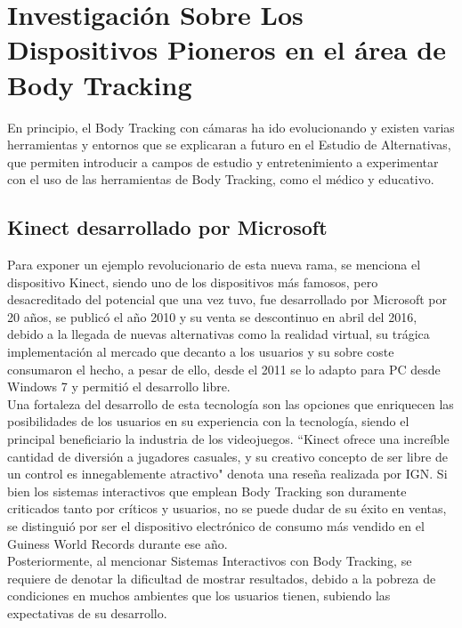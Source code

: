 \section{Investigación Sobre Los Dispositivos Pioneros en el área de Body Tracking}

En principio, el Body Tracking con cámaras ha ido evolucionando y existen varias herramientas y entornos que se explicaran a futuro en el Estudio de Alternativas, que permiten introducir a campos de estudio y entretenimiento a experimentar con el uso de las herramientas de Body Tracking, como el médico y educativo.\\

\subsection{Kinect desarrollado por Microsoft}

Para exponer un ejemplo revolucionario de esta nueva rama, se menciona el dispositivo Kinect, siendo uno de los dispositivos más famosos, pero desacreditado del potencial que una vez tuvo, fue desarrollado por Microsoft por 20 años, se publicó el año 2010 y su venta se descontinuo en abril del 2016, debido a la llegada de nuevas alternativas como la realidad virtual, su trágica implementación al mercado que decanto a los usuarios y  su sobre coste consumaron el hecho, a pesar de ello, desde el 2011 se lo adapto para PC desde Windows 7 y permitió el desarrollo libre. \\

Una fortaleza del desarrollo de esta tecnología son las opciones que enriquecen las posibilidades de los usuarios en su experiencia con la tecnología, siendo el principal beneficiario la industria de los videojuegos. 
``Kinect ofrece una increíble cantidad de diversión a jugadores casuales, y su creativo concepto de ser libre de un control es innegablemente atractivo" denota una reseña realizada por IGN. Si bien los sistemas interactivos que emplean Body Tracking son duramente criticados tanto por críticos y usuarios, no se puede dudar de su éxito en ventas, se distinguió por ser el dispositivo electrónico de consumo más vendido en el Guiness World Records durante ese año.\cite{7934445}\\
Posteriormente, al mencionar Sistemas Interactivos con Body Tracking, se requiere de denotar la dificultad de mostrar resultados, debido a la pobreza de condiciones en muchos ambientes que los usuarios tienen, subiendo las expectativas de su desarrollo. 

